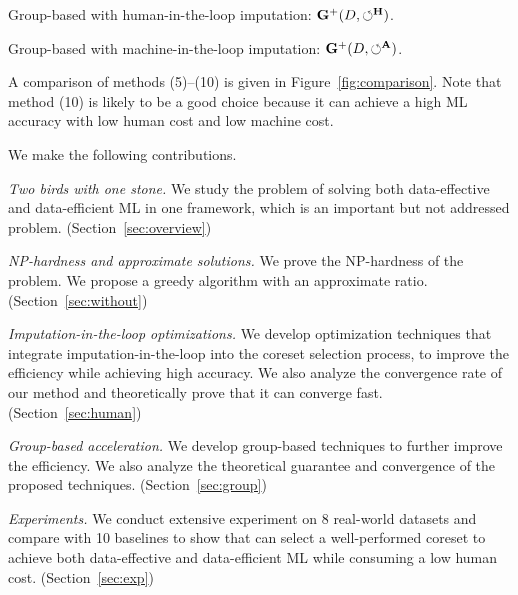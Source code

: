 \bi
\item[(9)] Group-based \ours with human-in-the-loop imputation: $\mathbf{G}^+(D, \circlearrowleft^\mathbf{H})$.
\item[(10)] Group-based \ours with machine-in-the-loop imputation: $\mathbf{G}^+(D, \circlearrowleft^\mathbf{A})$.
\ei

A comparison of methods (5)--(10) is given in Figure~\ref{fig:comparison}. Note that method (10) is likely to be a good choice because it can achieve a high ML accuracy with low human cost and low machine cost.
%


We make the following contributions.

\be
	\item[(i)] \textit{Two birds with one stone.} 
	We study the problem of solving both data-effective and data-efficient ML in one framework, which is an important but not addressed problem.
 	(Section~\ref{sec:overview})

 	\item[(ii)] \textit{NP-hardness and approximate solutions.}
	We prove the NP-hardness of the problem. We propose a greedy algorithm with an approximate ratio. 
	(Section~\ref{sec:without})

	\item[(iii)] \textit{Imputation-in-the-loop optimizations.}
	We develop optimization techniques that integrate imputation-in-the-loop into the coreset selection process, to improve the efficiency while achieving high accuracy. We also analyze the convergence rate of our method and theoretically prove that it can converge fast. 
	(Section~\ref{sec:human})
	
	\item[(iv)] \textit{Group-based acceleration.}
	We develop group-based techniques to further improve the efficiency. We also analyze the theoretical guarantee and convergence of the proposed techniques. 
	(Section~\ref{sec:group})



	\item[(v)] \textit{Experiments.}
	We conduct extensive experiment on 8 real-world datasets and compare with 10 baselines to show that \ours can select a well-performed coreset to achieve both data-effective and data-efficient ML while consuming a low human cost. 
	(Section~\ref{sec:exp})
\ee

